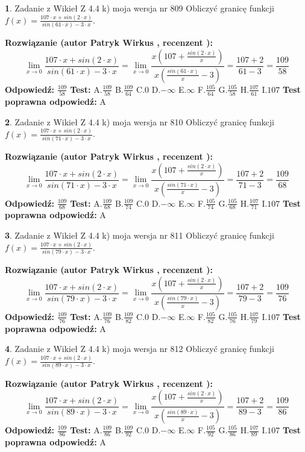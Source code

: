\documentclass[12pt, a4paper]{article}
\theoremstyle{definition} %
\newtheorem{zad}{}
\newcommand{\zadStart}[1]{\begin{zad}#1\newline}
\newcommand{\zadStop}{\end{zad}}
\newcommand{\rozwStart}[2]{\noindent \textbf{Rozwiązanie (autor #1 , recenzent #2): }\newline}
\newcommand{\rozwStop}{\newline}
\newcommand{\odpStart}{\noindent \textbf{Odpowiedź:}\newline}
\newcommand{\odpStop}{\newline}
\newcommand{\testStart}{\noindent \textbf{Test:}\newline}
\newcommand{\testStop}{\newline}
\newcommand{\kluczStart}{\noindent \textbf{Test poprawna odpowiedź:}\newline}
\newcommand{\kluczStop}{\newline}
\begin{document}
\zadStart{Zadanie z Wikieł Z 4.4 k) moja wersja nr 809}
Obliczyć granicę funkcji $f(x)=\frac{107\cdot x +sin(2\cdot x)}{sin(61\cdot x) -3\cdot x}$.
\zadStop
\rozwStart{Patryk Wirkus}{}
$$\lim\limits_{x\to 0}\frac{107\cdot x +sin(2\cdot x)}{sin(61\cdot x) -3\cdot x}
=\lim\limits_{x\to 0}\frac{x(107+\frac{sin(2\cdot x)}{x})}{x(\frac{sin(61\cdot x)}{x}-3)}
=\frac{107+2}{61-3} = \frac{109}{58}$$
\rozwStop
\odpStart
$\frac{109}{58}$
\odpStop
\testStart
A.$\frac{109}{58}$
B.$\frac{109}{64}$
C.$0$
D.$-\infty$
E.$\infty$
F.$\frac{105}{64}$
G.$\frac{105}{58}$
H.$\frac{107}{61}$
I.$107$
\testStop
\kluczStart
A
\kluczStop



\zadStart{Zadanie z Wikieł Z 4.4 k) moja wersja nr 810}
Obliczyć granicę funkcji $f(x)=\frac{107\cdot x +sin(2\cdot x)}{sin(71\cdot x) -3\cdot x}$.
\zadStop
\rozwStart{Patryk Wirkus}{}
$$\lim\limits_{x\to 0}\frac{107\cdot x +sin(2\cdot x)}{sin(71\cdot x) -3\cdot x}
=\lim\limits_{x\to 0}\frac{x(107+\frac{sin(2\cdot x)}{x})}{x(\frac{sin(71\cdot x)}{x}-3)}
=\frac{107+2}{71-3} = \frac{109}{68}$$
\rozwStop
\odpStart
$\frac{109}{68}$
\odpStop
\testStart
A.$\frac{109}{68}$
B.$\frac{109}{74}$
C.$0$
D.$-\infty$
E.$\infty$
F.$\frac{105}{74}$
G.$\frac{105}{68}$
H.$\frac{107}{71}$
I.$107$
\testStop
\kluczStart
A
\kluczStop



\zadStart{Zadanie z Wikieł Z 4.4 k) moja wersja nr 811}
Obliczyć granicę funkcji $f(x)=\frac{107\cdot x +sin(2\cdot x)}{sin(79\cdot x) -3\cdot x}$.
\zadStop
\rozwStart{Patryk Wirkus}{}
$$\lim\limits_{x\to 0}\frac{107\cdot x +sin(2\cdot x)}{sin(79\cdot x) -3\cdot x}
=\lim\limits_{x\to 0}\frac{x(107+\frac{sin(2\cdot x)}{x})}{x(\frac{sin(79\cdot x)}{x}-3)}
=\frac{107+2}{79-3} = \frac{109}{76}$$
\rozwStop
\odpStart
$\frac{109}{76}$
\odpStop
\testStart
A.$\frac{109}{76}$
B.$\frac{109}{82}$
C.$0$
D.$-\infty$
E.$\infty$
F.$\frac{105}{82}$
G.$\frac{105}{76}$
H.$\frac{107}{79}$
I.$107$
\testStop
\kluczStart
A
\kluczStop



\zadStart{Zadanie z Wikieł Z 4.4 k) moja wersja nr 812}
Obliczyć granicę funkcji $f(x)=\frac{107\cdot x +sin(2\cdot x)}{sin(89\cdot x) -3\cdot x}$.
\zadStop
\rozwStart{Patryk Wirkus}{}
$$\lim\limits_{x\to 0}\frac{107\cdot x +sin(2\cdot x)}{sin(89\cdot x) -3\cdot x}
=\lim\limits_{x\to 0}\frac{x(107+\frac{sin(2\cdot x)}{x})}{x(\frac{sin(89\cdot x)}{x}-3)}
=\frac{107+2}{89-3} = \frac{109}{86}$$
\rozwStop
\odpStart
$\frac{109}{86}$
\odpStop
\testStart
A.$\frac{109}{86}$
B.$\frac{109}{92}$
C.$0$
D.$-\infty$
E.$\infty$
F.$\frac{105}{92}$
G.$\frac{105}{86}$
H.$\frac{107}{89}$
I.$107$
\testStop
\kluczStart
A
\kluczStop
\end{document}
